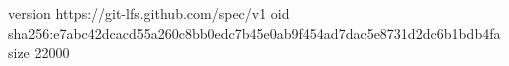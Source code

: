version https://git-lfs.github.com/spec/v1
oid sha256:e7abc42dcacd55a260c8bb0edc7b45e0ab9f454ad7dac5e8731d2dc6b1bdb4fa
size 22000

